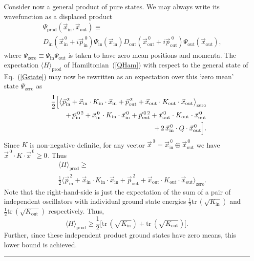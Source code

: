 \documentclass[twocolumn,aps,showpacs,prl]{revtex4}
\begin{document}
Consider now a general product of pure states. We may always write its
wavefunction as a displaced product
\begin{eqnarray}
\!\!\!\!\!&&\!\Psi_{\text{prod}}(\vec x_{\text{in}}, \vec x_{\text{out}})
\label{Gstate}\equiv \\
\!\!\!\!\!&&\!
D_{\text{in}}(\vec x_{\text{in}}^{\,0}+i\vec p_{\text{in}}^{\;0})
\Psi_{\text{in}}(\vec x_{\text{in}})
D_{\text{out}}(\vec x_{\text{out}}^{\,0}+i\vec p_{\text{out}}^{\;0})
\Psi_{\text{out}}(\vec x_{\text{out}}),\nonumber
\end{eqnarray}
where $\Psi_{\text{zero}}\equiv \Psi_{\text{in}} \Psi_{\text{out}}$
is taken to have zero mean positions and momenta. The expectation 
$\langle H\rangle_{\text{prod}}$ of Hamiltonian~(\ref{QHam}) with
respect to the general state of Eq.~(\ref{Gstate}) may now be rewritten
as an expectation over this `zero mean' state $\Psi_{\text{zero}}$ as
\begin{eqnarray}
\!\!\!&&\frac{1}{2}\Bigl[\bigl\langle\vec p_{\text{in}}^{\,2}
+\vec x_{\text{in}}\cdot K_{\text{in}} \cdot \vec x_{\text{in}}
+ \vec p_{\text{out}}^{\,2}
+\vec x_{\text{out}}\cdot K_{\text{out}} \cdot \vec x_{\text{out}}
\bigr\rangle_{\text{zero}} \nonumber \\
\!\!\!&& +\,\vec p_{\text{in}}^{\;0\,2}
+\vec x_{\text{in}}^{\,0}\cdot K_{\text{in}} \cdot \vec x_{\text{in}}^{\,0}
+ \vec p_{\text{out}}^{\;0\,2}
+\vec x_{\text{out}}^{\,0}\cdot K_{\text{out}} \cdot \vec x_{\text{out}}^{\,0}
\nonumber \\
\!\!\!&&+\,2\,\vec x_{\text{in}}^{\,0}\cdot Q\cdot \vec x_{\text{out}}^{\,0}
\Bigr].
\end{eqnarray}
Since $K$ is non-negative definite, for any vector
$\vec x^{\,0}=\vec x_{\text{in}}^{\,0}\oplus \vec x_{\text{out}}^{\,0}$
we have $\vec x^{\,0}\cdot K \cdot \vec x^{\,0}\ge 0$. Thus
\begin{eqnarray}
\!\!\!\!\!&&\langle H\rangle_{\text{prod}}\ge\\
\!\!\!\!\!&& \frac{1}{2}
\bigl\langle\vec p_{\text{in}}^{\,2}
+\vec x_{\text{in}}\cdot K_{\text{in}} \cdot \vec x_{\text{in}}
+ \vec p_{\text{out}}^{\,2}
+\vec x_{\text{out}}\cdot K_{\text{out}} \cdot \vec x_{\text{out}}
\bigr\rangle_{\text{zero}}.\nonumber
\end{eqnarray}
Note that the right-hand-side is just the expectation of the sum of a pair
of independent oscillators with individual ground state energies 
$\frac{1}{2} \text{tr}\,( \sqrt{K_{\text{in}}})$ and 
$\frac{1}{2} \text{tr}\,( \sqrt{K_{\text{out}}})$ respectively. Thus,
\begin{equation}
\langle H\rangle_{\text{prod}}\ge 
\frac{1}{2}\bigl[ \text{tr}\,( \sqrt{K_{\text{in}}})
+\text{tr}\,( \sqrt{K_{\text{out}}})\bigr].
\end{equation}
Further, since these independent product ground states have zero means,
this lower bound is achieved.
${~}$\hfill \rule{2mm}{2mm}\\
\end{document}
